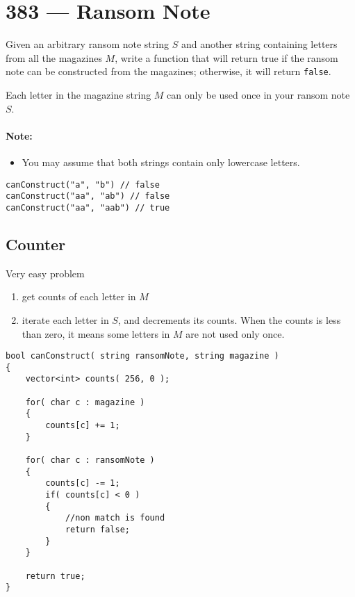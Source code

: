 \section{383 --- Ransom Note}
Given an arbitrary ransom note string $S$ and another string containing letters from all the magazines $M$, write a function that will return true if the ransom note can be constructed from the magazines; otherwise, it will return \texttt{false}.
\par
Each letter in the magazine string $M$ can only be used once in your ransom note $S$.

\paragraph{Note:}
\begin{itemize}
\item You may assume that both strings contain only lowercase letters.
\end{itemize}

\begin{lstlisting}[style=customc]
canConstruct("a", "b") // false
canConstruct("aa", "ab") // false
canConstruct("aa", "aab") // true
\end{lstlisting}

\subsection{Counter}
Very easy problem
\begin{enumerate}
\item get counts of each letter in $M$
\item iterate each letter in $S$, and decrements its counts. When the counts is less than zero, it means some letters in $M$ are not used only once.
\end{enumerate}

\setcounter{lstlisting}{0}
\begin{lstlisting}[style=customc, caption={Counter}]
bool canConstruct( string ransomNote, string magazine )
{
    vector<int> counts( 256, 0 );

    for( char c : magazine )
    {
        counts[c] += 1;
    }

    for( char c : ransomNote )
    {
        counts[c] -= 1;
        if( counts[c] < 0 )
        {
            //non match is found
            return false;
        }
    }

    return true;
}
\end{lstlisting}

